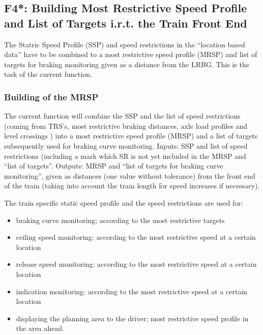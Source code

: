 
\subsection{F4*: Building Most Restrictive Speed Profile and List of Targets i.r.t. the Train Front End} \label{ss:MRSPandListOfTargets}


The Statric Speed Profile (SSP) and speed restrictions in the “location based data”  have to be combined to a most restrictive speed profile (MRSP) and list of targets for braking monitoring given as a distance from the LRBG. This is the task of the current function.

\subsubsection{Building of the MRSP}
The current function will combine the SSP and the list of speed restrictions (coming from TRS's, most restrictive braking distances, axle load profiles and level crossings ) into a most restrictive speed profile (MRSP) and a list of targets subsequently used for braking curve monitoring.
Inputs: SSP and list of speed restrictions (including a mark which SR is not yet included in the MRSP and “list of targets”. 
Outputs: MRSP and “list of targets for braking curve monitoring”, given as distances (one value without tolerance) from the front end of the train (taking into account the train length for speed increases if necessary).

The train specific static speed profile and the speed restrictions are used for:
\begin{itemize}
\item braking curve monitoring; according to the most restrictive targets
\item ceiling speed monitoring: according to the most restrictive speed at a certain location
\item release speed monitoring: according to the most restrictive speed at a certain location
\item indication monitoring: according to the most restrictive speed at a certain location
\item displaying the planning area to the driver; most restrictive speed profile in the area ahead.
\end{itemize}

